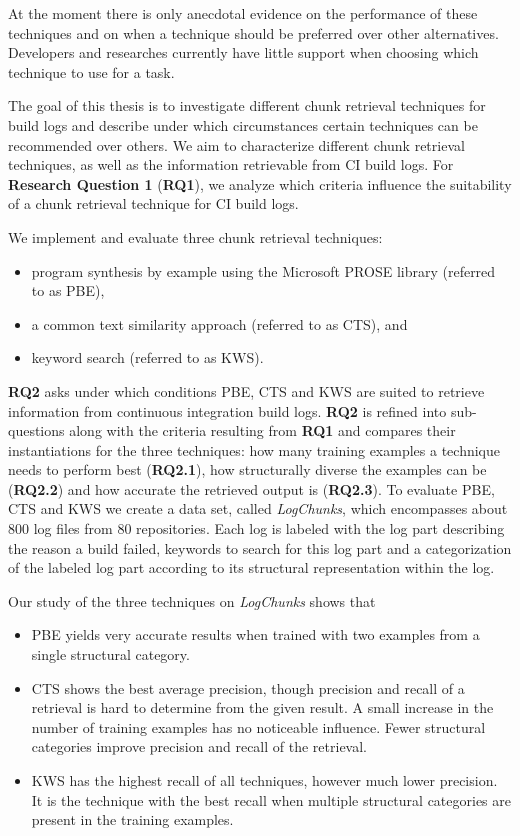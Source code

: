 \documentclass[\myrootdir/main.tex]{subfiles}
\begin{document}
At the moment there is only anecdotal evidence on the performance of these techniques and on when a technique should be preferred over other alternatives.
Developers and researches currently have little support when choosing which technique to use for a task.

The goal of this thesis is to investigate different chunk retrieval techniques for build logs and describe under which circumstances certain techniques can be recommended over others.
We aim to characterize different chunk retrieval techniques, as well as the information retrievable from CI build logs.
For \textbf{Research Question 1} (\textbf{RQ1}), we analyze which criteria influence the suitability of a chunk retrieval technique for CI build logs.

We implement and evaluate three chunk retrieval techniques:
\begin{itemize}
  \item program synthesis by example using the Microsoft PROSE library (referred to as PBE),
  \item a common text similarity approach (referred to as CTS), and
  \item keyword search (referred to as KWS).
\end{itemize}
\textbf{RQ2} asks under which conditions PBE, CTS and KWS are suited to retrieve information from continuous integration build logs.
\textbf{RQ2} is refined into sub-questions along with the criteria resulting from \textbf{RQ1} and compares their instantiations for the three techniques:
how many training examples a technique needs to perform best (\textbf{RQ2.1}), how structurally diverse the examples can be (\textbf{RQ2.2}) and how accurate the retrieved output is (\textbf{RQ2.3}).
To evaluate PBE, CTS and KWS we create a data set, called \emph{LogChunks}, which encompasses about 800 log files from 80 repositories.
Each log is labeled with the log part describing the reason a build failed, keywords to search for this log part and a categorization of the labeled log part according to its structural representation within the log.

Our study of the three techniques on \emph{LogChunks} shows that
\begin{itemize}
  \item PBE yields very accurate results when trained with two examples from a single structural category.
  \item CTS shows the best average precision, though precision and recall of a retrieval is hard to determine from the given result.
  A small increase in the number of training examples has no noticeable influence.
  Fewer structural categories improve precision and recall of the retrieval.
  \item KWS has the highest recall of all techniques, however much lower precision.
  It is the technique with the best recall when multiple structural categories are present in the training examples.
\end{itemize}
\end{document}
